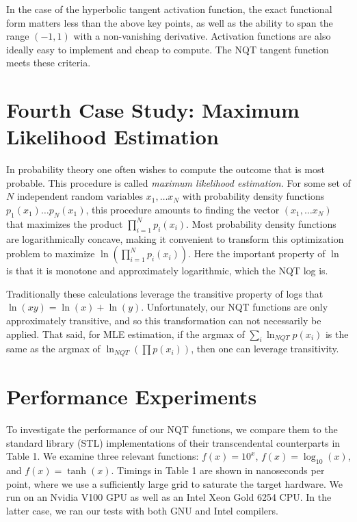\documentclass[a4paper,fleqn]{cas-sc}
\begin{document}
In the case of the hyperbolic tangent activation function, the exact
functional form matters less than the above key points, as well as the
ability to span the range $(-1, 1)$ with a non-vanishing
derivative. Activation functions are also ideally easy to implement
and cheap to compute. The NQT tangent function meets these criteria.

\section{Fourth Case Study: Maximum Likelihood Estimation}
\label{sec:MLE}

In probability theory one often wishes to compute the outcome that is
most probable. This procedure is called \textit{maximum likelihood
  estimation.} For some set of $N$ independent random variables
$x_1,\ldots x_N$ with probability density functions
$p_1(x_1)\ldots p_N(x_1)$, this procedure amounts to finding the
vector $(x_1, \ldots x_N)$ that maximizes the product
$\prod_{i=1}^N p_i(x_i)$. Most probability density functions are
logarithmically concave, making it convenient to transform this
optimization problem to maximize \citep{millar2011maximum}
$\ln(\prod_{i=1}^N p_i(x_i))$.  Here the important property of $\ln$
is that it is monotone and approximately logarithmic, which the NQT
log is.

Traditionally these calculations leverage the transitive property of
logs that $\ln(x y) = \ln(x) + \ln(y)$. Unfortunately, our NQT
functions are only approximately transitive, and so this
transformation can not necessarily be applied. That said, for MLE
estimation, if the argmax of $\sum_i \ln_{NQT}p(x_i)$ is the same as
the argmax of $\ln_{NQT}(\prod p(x_i))$, then one can leverage
transitivity.

\section{Performance Experiments}
\label{sec:results}

To investigate the performance of our NQT functions, we compare them
to the standard library (STL) implementations of their transcendental
counterparts in Table 1. We examine three relevant functions:
$f(x) = 10^x$, $f(x) = \log_{10}(x)$, and $f(x) = \tanh(x)$. Timings
in Table 1 are shown in nanoseconds per point, where we use a
sufficiently large grid to saturate the target hardware. We run on an
Nvidia V100 GPU as well as an Intel Xeon Gold 6254 CPU. In the latter
case, we ran our tests with both GNU and Intel compilers.
\end{document}
